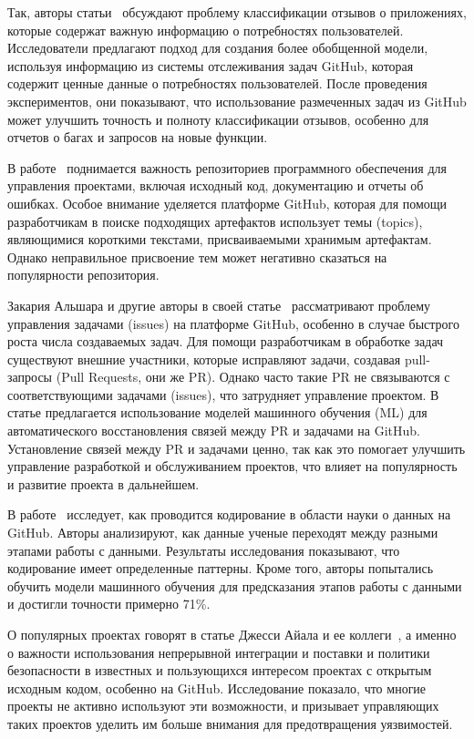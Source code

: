 Так, авторы статьи~\cite{abs-2308-14211} обсуждают проблему классификации отзывов о приложениях, которые содержат важную информацию о потребностях пользователей. Исследователи предлагают подход для создания более обобщенной модели, используя информацию из системы отслеживания задач GitHub, которая содержит ценные данные о потребностях пользователей. После проведения экспериментов, они показывают, что использование размеченных задач из GitHub может улучшить точность и полноту классификации отзывов, особенно для отчетов о багах и запросов на новые функции. 

В работе~\cite{RoccoRSNR23} поднимается важность репозиториев программного обеспечения для управления проектами, включая исходный код, документацию и отчеты об ошибках. Особое внимание уделяется платформе GitHub, которая для помощи разработчикам в поиске подходящих артефактов использует темы (topics), являющимися короткими текстами, присваиваемыми хранимым артефактам. Однако неправильное присвоение тем может негативно сказаться на популярности репозитория. 

Закария Альшара и другие авторы в своей статье~\cite{AlsharaSSS23} рассматривают проблему управления задачами (issues) на платформе GitHub, особенно в случае быстрого роста числа создаваемых задач. Для помощи разработчикам в обработке задач существуют внешние участники, которые исправляют задачи, создавая pull-запросы (Pull Requests, они же PR). Однако часто такие PR не связываются с соответствующими задачами (issues), что затрудняет управление проектом. В статье предлагается использование моделей машинного обучения (ML) для автоматического восстановления связей между PR и задачами на GitHub. Установление связей между PR и задачами ценно, так как это помогает улучшить управление разработкой и обслуживанием проектов, что влияет на популярность и развитие проекта в дальнейшем.

В работе~\cite{RamasamySBB23} исследует, как проводится кодирование в области науки о данных на GitHub. Авторы анализируют, как данные ученые переходят между разными этапами работы с данными. Результаты исследования показывают, что кодирование имеет определенные паттерны. Кроме того, авторы попытались обучить модели машинного обучения для предсказания этапов работы с данными и достигли точности примерно 71\%.

О популярных проектах говорят в статье Джесси Айала и ее коллеги~\cite{AyalaG23}, а именно о важности использования непрерывной интеграции и поставки и политики безопасности в известных и пользующихся интересом проектах с открытым исходным кодом, особенно на GitHub. Исследование показало, что многие проекты не активно используют эти возможности, и призывает управляющих таких проектов уделить им больше внимания для предотвращения уязвимостей. 

